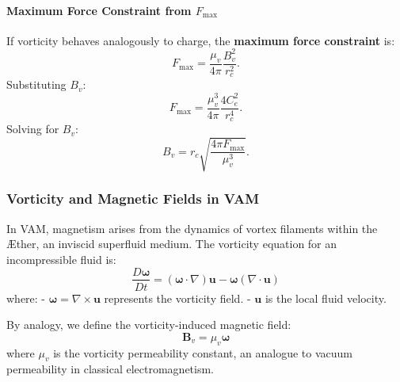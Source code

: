     \paragraph*{Maximum Force Constraint from \( F_{\text{max}} \)}
    If vorticity behaves analogously to charge, the \textbf{maximum force constraint} is:
    \begin{equation}
        F_{\text{max}} = \frac{\mu_v}{4\pi} \frac{B_v^2}{r_c^2}.
    \end{equation}
    Substituting \( B_v \):
    \begin{equation}
        F_{\text{max}} = \frac{\mu_v^3}{4\pi} \frac{4 C_e^2}{r_c^4}.
    \end{equation}
    Solving for \( B_v \):
    \begin{equation}
        B_v = r_c \sqrt{\frac{4\pi F_{\text{max}}}{\mu_v^3}}.
    \end{equation}



\subsubsection*{Vorticity and Magnetic Fields in VAM}
    In VAM, magnetism arises from the dynamics of vortex filaments within the \AE ther, an inviscid superfluid medium. The vorticity equation for an incompressible fluid is:
    \begin{equation}
        \frac{D\boldsymbol{\omega}}{Dt} = (\boldsymbol{\omega} \cdot \nabla) \boldsymbol{u} - \boldsymbol{\omega} (\nabla \cdot \boldsymbol{u})
    \end{equation}
    where:
    - $\boldsymbol{\omega} = \nabla \times \boldsymbol{u}$ represents the vorticity field.
    - $\boldsymbol{u}$ is the local fluid velocity.

    By analogy, we define the vorticity-induced magnetic field:
    \begin{equation}
        \boldsymbol{B}_v = \mu_v \boldsymbol{\omega}
    \end{equation}
    where $\mu_v$ is the vorticity permeability constant, an analogue to vacuum permeability in classical electromagnetism.

